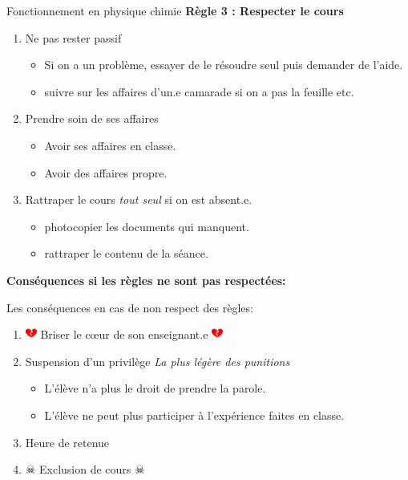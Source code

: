 \documentclass[10pt]{article}
\newcommand{\titre}{Fonctionnement en physique chimie} %
\begin{document}
\begin{titlebox}{\titre}
    \textbf{\color{DarkRed} {Règle 3 : Respecter le cours}}
    \begin{enumerate}
        \item Ne pas rester passif
        \begin{itemize}
            \item Si on a un problème, essayer de le résoudre seul puis demander de l'aide.
            \item suivre sur les affaires d'un.e camarade si on a pas la feuille etc.
        \end{itemize}
        \item Prendre soin de ses affaires
        \begin{itemize}
            \item Avoir ses affaires en classe.
            \item Avoir des affaires propre.
        \end{itemize}
        \item Rattraper le cours \emph{tout seul} si on est absent.e.
        \begin{itemize}
            \item photocopier les documents qui manquent.
            \item rattraper le contenu de la séance.
        \end{itemize}
    \end{enumerate}

    \tcblower

    \begin{figure}
        \vspace*{-0.5cm}
    \end{figure}

    \textbf{\color{DarkRed} {Conséquences si les règles ne sont pas respectées:}}

    Les conséquences en cas de non respect des règles: 
    \begin{enumerate}
        \item \includegraphics[width=1em]{dessin.pdf} Briser le cœur de son enseignant.e \includegraphics[width=1em]{dessin.pdf}
        \item Suspension d'un privilège
        \textit{La plus légère des punitions}
        \begin{itemize}
            \item L'élève n'a plus le droit de prendre la parole.
            \item L'élève ne peut plus participer à l'expérience faites en classe.
        \end{itemize}
        \item Heure de retenue
        \item $\skull$ Exclusion de cours $\skull$  
    \end{enumerate}


\end{titlebox}
\end{document}
